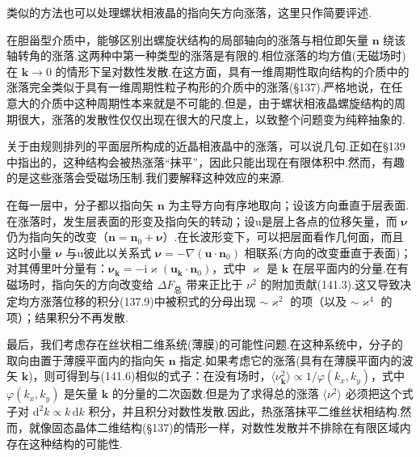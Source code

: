 类似的方法也可以处理螺状相液晶的指向矢方向涨落，这里只作简要评述.

在胆甾型介质中，能够区别出螺旋状结构的局部轴向的涨落与相位即矢量 $\boldsymbol{n}$ 绕该轴转角的涨落.这两种中第一种类型的涨落是有限的.相位涨落的均方值(无磁场时)在 $\boldsymbol{k}\to0$ 的情形下呈对数性发散.在这方面，具有一维周期性取向结构的介质中的涨落完全类似于具有一维周期性粒子构形的介质中的涨落(§137).严格地说，在任意大的介质中这种周期性本来就是不可能的.但是，由于螺状相液晶螺旋结构的周期很大，涨落的发散性仅仅出现在很大的尺度上，以致整个问题变为纯粹抽象的.

关于由规则排列的平面层所构成的近晶相液晶中的涨落，可以说几句.正如在§139中指出的，这种结构会被热涨落“抹平”，因此只能出现在有限体积中.然而，有趣的是这些涨落会受磁场压制.我们要解释这种效应的来源.

在每一层中，分子都以指向矢 $\boldsymbol{n}$ 为主导方向有序地取向；设该方向垂直于层表面.在涨落时，发生层表面的形变及指向矢的转动；设u是层上各点的位移矢量，而 $\boldsymbol{\nu}$ 仍为指向矢的改变（$\boldsymbol{n}=\boldsymbol{n}_0+\boldsymbol{\nu}$）.在长波形变下，可以把层面看作几何面，而且这时小量 $\boldsymbol{\nu}$ 与u彼此以关系式 $\boldsymbol{\nu}=-\nabla(\boldsymbol{u}\cdot\boldsymbol{n}_0)$ 相联系(方向的改变垂直于表面)；对其傅里叶分量有：$\boldsymbol{\nu}_{\boldsymbol{k}}=-\mathrm{i}\varkappa(\boldsymbol{u}_{\boldsymbol{k}}\cdot\boldsymbol{n}_0)$，式中 $\varkappa$ 是 $\boldsymbol{k}$ 在层平面内的分量.在有磁场时，指向矢的方向改变给 $\Delta F_{\text{总}}$ 带来正比于 $\nu^2$ 的附加贡献(141.3).这又导致决定均方涨落位移的积分(137.9)中被积式的分母出现 $\sim\varkappa^2$ 的项（以及 $\sim\varkappa^4$ 的项）；结果积分不再发散.

最后，我们考虑存在丝状相二维系统(薄膜)的可能性问题.在这种系统中，分子的取向由置于薄膜平面内的指向矢 $\boldsymbol{n}$ 指定.如果考虑它的涨落(具有在薄膜平面内的波矢 $\boldsymbol{k}$)，则可得到与(141.6)相似的式子：在没有场时，$\langle\nu_{\boldsymbol{k}}^2\rangle\propto1/\varphi(k_x,k_y)$，式中 $\varphi(k_x,k_y)$ 是矢量 $\boldsymbol{k}$ 的分量的二次函数.但是为了求得总的涨落 $\langle\nu^2\rangle$ 必须把这个式子对 $\mathrm{d}^2k\propto k\,\mathrm{d}k$ 积分，并且积分对数性发散.因此，热涨落抹平二维丝状相结构.然而，就像固态晶体二维结构(§137)的情形一样，对数性发散并不排除在有限区域内存在这种结构的可能性.